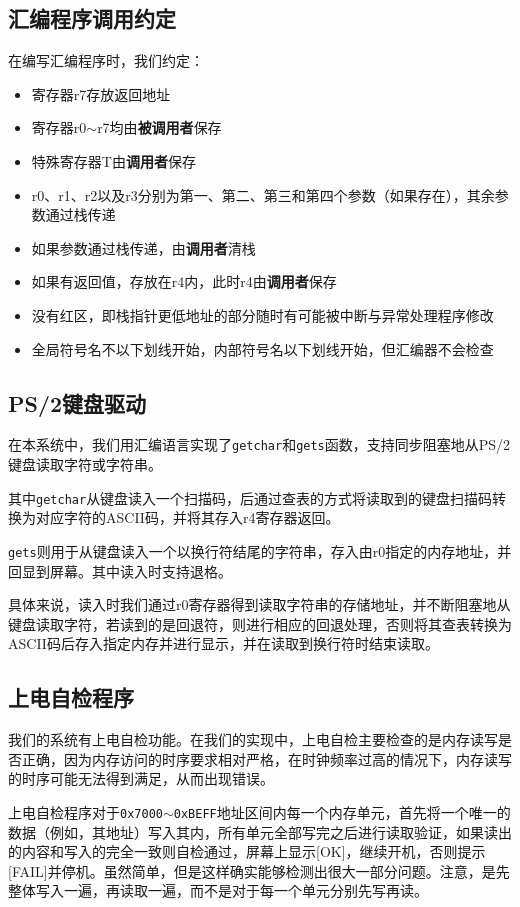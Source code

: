 \documentclass[11pt,utf8]{report}
\begin{document}
\subsection{汇编程序调用约定}
	\par 在编写汇编程序时，我们约定：
	\begin{itemize}
		\item 寄存器r7存放返回地址
		\item 寄存器r0$\sim$r7均由\textbf{被调用者}保存
		\item 特殊寄存器T由\textbf{调用者}保存
		\item r0、r1、r2以及r3分别为第一、第二、第三和第四个参数（如果存在），其余参数通过栈传递
		\item 如果参数通过栈传递，由\textbf{调用者}清栈
		\item 如果有返回值，存放在r4内，此时r4由\textbf{调用者}保存
		\item 没有红区，即栈指针更低地址的部分随时有可能被中断与异常处理程序修改
		\item 全局符号名不以下划线开始，内部符号名以下划线开始，但汇编器不会检查
	\end{itemize}

\subsection{PS/2键盘驱动}
	在本系统中，我们用汇编语言实现了\texttt{getchar}和\texttt{gets}函数，支持同步阻塞地从PS/2键盘读取字符或字符串。

	其中\texttt{getchar}从键盘读入一个扫描码，后通过查表的方式将读取到的键盘扫描码转换为对应字符的ASCII码，并将其存入r4寄存器返回。

	\texttt{gets}则用于从键盘读入一个以换行符结尾的字符串，存入由r0指定的内存地址，并回显到屏幕。其中读入时支持退格。

	具体来说，读入时我们通过r0寄存器得到读取字符串的存储地址，并不断阻塞地从键盘读取字符，若读到的是回退符，则进行相应的回退处理，否则将其查表转换为ASCII码后存入指定内存并进行显示，并在读取到换行符时结束读取。

\subsection{上电自检程序}
	\par 我们的系统有上电自检功能。在我们的实现中，上电自检主要检查的是内存读写是否正确，因为内存访问的时序要求相对严格，在时钟频率过高的情况下，内存读写的时序可能无法得到满足，从而出现错误。
	
	\par 上电自检程序对于\texttt{0x7000}$\sim$\texttt{0xBEFF}地址区间内每一个内存单元，首先将一个唯一的数据（例如，其地址）写入其内，所有单元全部写完之后进行读取验证，如果读出的内容和写入的完全一致则自检通过，屏幕上显示[OK]，继续开机，否则提示[FAIL]并停机。虽然简单，但是这样确实能够检测出很大一部分问题。注意，是先整体写入一遍，再读取一遍，而不是对于每一个单元分别先写再读。
\end{document}
